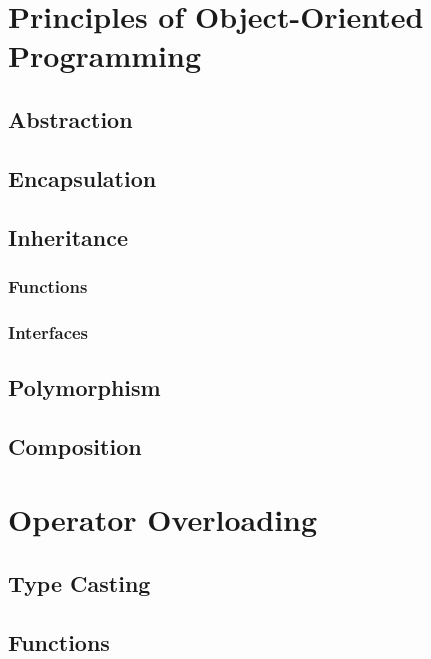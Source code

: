 \documentclass{article}
\title{\thistitle}
\author{\me}
\date{\today}
\begin{document}
\maketitle
\tableofcontents
\pagebreak

\section{Principles of Object-Oriented Programming}

\subsection{Abstraction}

\subsection{Encapsulation}

\subsection{Inheritance}

\subsubsection{ Functions}

\subsubsection{Interfaces}

\subsection{Polymorphism}

\subsection{Composition }

\section{Operator Overloading}

\subsection{Type Casting}

\subsection{ Functions}
\end{document}
